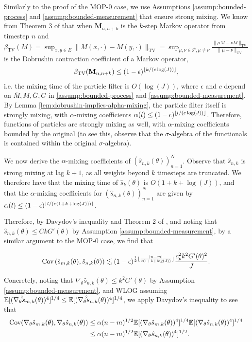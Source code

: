 \documentclass{article}
\begin{document}
Similarly to the proof of the MOP-$0$ case, we use Assumptions \ref{assump:bounded-process} and \ref{assump:bounded-measurement} that ensure strong mixing. We know from Theorem 3 of \cite{karjalainen2023} that when $\textbf{M}_{n,n+k}$ is the $k$-step Markov operator from timestep $n$ and $\beta_{\text{TV}}(M) = \sup _{x, y \in E}\|M(x, \cdot)-M(y, \cdot)\|_{\mathrm{TV}}=\sup _{\mu, \nu \in \mathcal{P}, \mu \neq \nu} \frac{\|\mu M-\nu M\|_{\mathrm{TV}}}{\|\mu-\nu\|_{\mathrm{TV}}}$ is the Dobrushin contraction coefficient of a Markov operator, 
$$\beta_{\text{TV}}(\textbf{M}_{n,n+k}) \leq (1-\epsilon)^{\lfloor k/(c\log(J)) \rfloor},$$
i.e. the mixing time of the particle filter is $O(\log(J))$, where $\epsilon$ and $c$ depend on $\bar{M}, \underbar{M}, \bar{G}, \underbar{G}$ in \ref{assump:bounded-process} and \ref{assump:bounded-measurement}. By Lemma \ref{lem:dobrushin-implies-alpha-mixing}, the particle filter itself is strongly mixing, with $\alpha$-mixing coefficients $\alpha(l) \leq (1-\epsilon)^{\lfloor l/(c\log(J)) \rfloor}$. Therefore, functions of particles are strongly mixing as well, with $\alpha$-mixing coefficients bounded by the original (to see this, observe that the $\sigma$-algebra of the functionals is contained within the original $\sigma$-algebra).

We now derive the $\alpha$-mixing coefficients of $(\hat s_{n,k}(\theta))_{n=1}^N$. Observe that $\hat s_{n,k}$ is strong mixing at lag $k+1$, as all weights beyond $k$ timesteps are truncated. We therefore have that the mixing time of $\hat s_k(\theta)$ is $O(1+k+\log(J))$, and that the $\alpha$-mixing coefficients for $(\hat s_{n,k}(\theta))_{n=1}^N$ are given by $\alpha(l) \leq (1-\epsilon)^{\lfloor l/(c(1+k+\log(J))) \rfloor}$.

Therefore, by Davydov's inequality and Theorem 2 of \cite{delMoral03}, and noting that $\hat s_{n,k}(\theta) \leq CkG'(\theta)$ by Assumption \ref{assump:bounded-measurement}, by a similar argument to the MOP-0 case, we find that 

$$\text{Cov}\left(\hat s_{m,k}(\theta), \hat s_{n,k}(\theta)\right) \lesssim (1-\epsilon)^{\frac{1}{2}\lfloor \frac{|n-m|}{c(1+k+\log(J))} \rfloor}\frac{c_p^2k^2G'(\theta)^2}{J}.$$

Concretely, noting that $\nabla_\theta\hat s_{n,k}(\theta)\leq k^2G'(\theta)$ by Assumption \ref{assump:bounded-measurement}, and WLOG assuming $\mathbb{E}[(\nabla_\theta\hat\hat s_{m,k}(\theta))^4]^{1/4}\leq\mathbb{E}[(\nabla_\theta\hat\hat s_{n,k}(\theta))^4]^{1/4}$, we apply Davydov's inequality to see that
\begin{align*}
    \text{Cov}(\nabla_\theta\hat s_{m,k}(\theta), \nabla_\theta\hat s_{n,k}(\theta)) 
    &\leq \alpha(n-m)^{1/2}\mathbb{E}[(\nabla_\theta\hat s_{m,k}(\theta))^4]^{1/4}\mathbb{E}[(\nabla_\theta\hat s_{n,k}(\theta))^4]^{1/4}\\
    &\leq \alpha(n-m)^{1/2}\mathbb{E}[(\nabla_\theta\hat s_{n,k}(\theta))^4]^{1/2}.
\end{align*}
\end{document}
